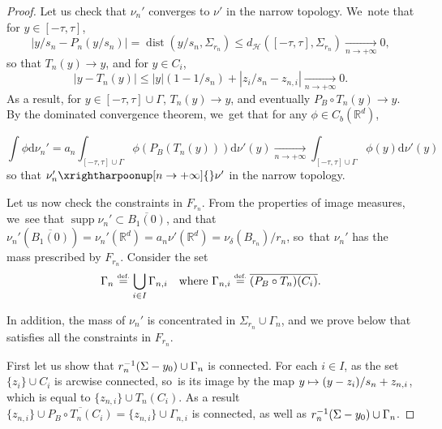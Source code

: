 \documentclass[10pt]{amsart}
\newcommand\mto{\mathchoice{\longmapsto}{\mapsto}{\mapsto}{\mapsto}}
\theoremstyle{definition}
\newcommand{\eqdef}{\ensuremath{\stackrel{\mbox{\upshape\tiny def.}}{=}}}
\newcommand{\RR}{\mathbb{R}}
\DeclareMathOperator{\dist}{dist}
\DeclareMathOperator{\supp}{supp}
\newcommand{\distH}{d_{\mathcal{H}}}
\newcommand\dd{\mathrm{d}}
\newcommand{\abs}[1]{\left\lvert#1\right\rvert}
\begin{document}
\begin{proof}
Let us check that $\nu_n'$ converges to $\nu'$ in the narrow topology. We~note that for $y\in [-\tau,\tau]$,
\[
|y/s_{n} - P_n(y/s_{n})| = \dist\left(y/s_{n}, \Sigma_{r_n}\right) \le \distH\left([-\tau, \tau], \Sigma_{r_n}\right)\xrightarrow[n\to +\infty]{} 0,
\]
so that $T_{n}(y)\to y$, and for $y\in C_{i}$,
\[
\abs{y-T_{n}(y)}\le \abs{y}(1-1/s_{n}) + \abs{z_i/s_n-z_{n,i}}\xrightarrow[n\to +\infty]{} 0.
\]
As a result, for $y\in [-\tau,\tau]\cup \Gamma$, $T_n(y)\to y$, and eventually $P_B\circ T_n(y)\to y$.
By the dominated convergence theorem, we~get that for any $\phi\in C_b(\RR^d)$,

\[
\int\phi\dd \nu_n'
=
a_n\int_{[-\tau,\tau]\cup \Gamma}\phi\left(P_B(T_n(y))\right)\dd \nu'(y)
\xrightarrow[n\to +\infty]{}
\int_{[-\tau,\tau]\cup \Gamma}\phi\left(y\right)\dd \nu'(y)
\]
so that $\nu_n'\xrightharpoonup[n\to +\infty]{}\nu'$ in the narrow topology.

Let us now check the constraints in $F_{r_n}$. From the properties of image measures, we~see that $\supp \nu_n'\subset \overline{B_{1}(0)}$, and that $\nu_n'(\overline{B_{1}(0)})=\nu_n'(\RR^d)=a_n\nu'(\RR^{d})= \nu_{\delta}(B_{r_n})/r_n$, so~that $\nu_n'$ has the mass prescribed by $F_{r_n}$. Consider the set
\begin{equation}\label{eq.defgamman}
\Gamma_n\eqdef
\bigcup_{i\in I} \Gamma_{n,i}
\quad
\mbox{where }
\Gamma_{n,i}\eqdef \overline{(P_B\circ T_{n})(C_{i})}.
\end{equation}

In addition, the mass of $\nu_n'$ is concentrated in $\Sigma_{r_n}\cup \Gamma_n$, and we prove below that satisfies all the constraints in $F_{r_{n}}$.

First let us show that $r_n^{-1}(\Sigma -\nobreak y_0) \cup\nobreak \Gamma_n$ is connected. For each $i\in I$, as the set $\{z_{i}\}\cup C_{i}$ is arcwise connected, so~is its image by the map $y\mto (y-z_{i})/s_n+z_{n,i}$, which is equal to $\{z_{n,i}\}\cup T_n(C_i)$. As a result $\{z_{n,i}\}\cup \overline{P_B\circ T_n(C_i)} = \{z_{n,i}\}\cup \Gamma_{n,i}$ is connected, as well as $r_n^{-1}(\Sigma -\nobreak y_0) \cup\nobreak \Gamma_n$.


\end{proof}
\end{document}
